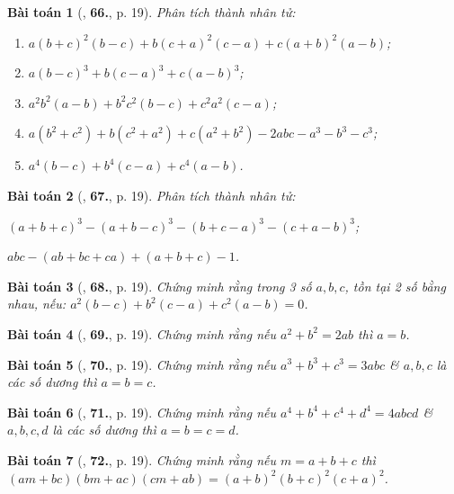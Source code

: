 \documentclass{article}
\numberwithin{equation}{section}
\newtheorem{baitoan}{Bài toán}[section]
\begin{document}
\begin{baitoan}[\cite{Binh_Toan_8_tap_1}, \textbf{66.}, p. 19]
	Phân tích thành nhân tử:
	\begin{enumerate}
		\item[(a)] $a(b + c)^2(b - c) + b(c + a)^2(c - a) + c(a + b)^2(a - b)$;
		\item[(b)] $a(b - c)^3 + b(c - a)^3 + c(a - b)^3$;
		\item[(c)] $a^2b^2(a - b) + b^2c^2(b - c) + c^2a^2(c - a)$;
		\item[(d)] $a(b^2 + c^2) + b(c^2 + a^2) + c(a^2 + b^2) - 2abc - a^3 - b^3 - c^3$;
		\item[(e)] $a^4(b - c) + b^4(c - a) + c^4(a - b)$.
	\end{enumerate}
\end{baitoan}

\begin{baitoan}[\cite{Binh_Toan_8_tap_1}, \textbf{67.}, p. 19]
	Phân tích thành nhân tử:
	\begin{enumerate*}
		\item[(a)] $(a + b + c)^3 - (a + b - c)^3 - (b + c - a)^3 - (c + a - b)^3$;
		\item[(b)] $abc - (ab + bc + ca) + (a + b + c) - 1$.
	\end{enumerate*}
\end{baitoan}

\begin{baitoan}[\cite{Binh_Toan_8_tap_1}, \textbf{68.}, p. 19]
	Chứng minh rằng trong 3 số $a,b,c$, tồn tại 2 số bằng nhau, nếu: $a^2(b - c) + b^2(c - a) + c^2(a - b) = 0$.
\end{baitoan}

\begin{baitoan}[\cite{Binh_Toan_8_tap_1}, \textbf{69.}, p. 19]
	Chứng minh rằng nếu $a^2 + b^2 = 2ab$ thì $a = b$.
\end{baitoan}

\begin{baitoan}[\cite{Binh_Toan_8_tap_1}, \textbf{70.}, p. 19]
	Chứng minh rằng nếu $a^3 + b^3 + c^3 = 3abc$ \& $a,b,c$ là các số dương thì $a = b = c$.
\end{baitoan}

\begin{baitoan}[\cite{Binh_Toan_8_tap_1}, \textbf{71.}, p. 19]
	Chứng minh rằng nếu $a^4 + b^4 + c^4 + d^4 = 4abcd$ \& $a,b,c,d$ là các số dương thì $a = b = c = d$.
\end{baitoan}

\begin{baitoan}[\cite{Binh_Toan_8_tap_1}, \textbf{72.}, p. 19]
	Chứng minh rằng nếu $m = a + b + c$ thì $(am + bc)(bm + ac)(cm + ab) = (a + b)^2(b + c)^2(c + a)^2$.
\end{baitoan}
\end{document}
